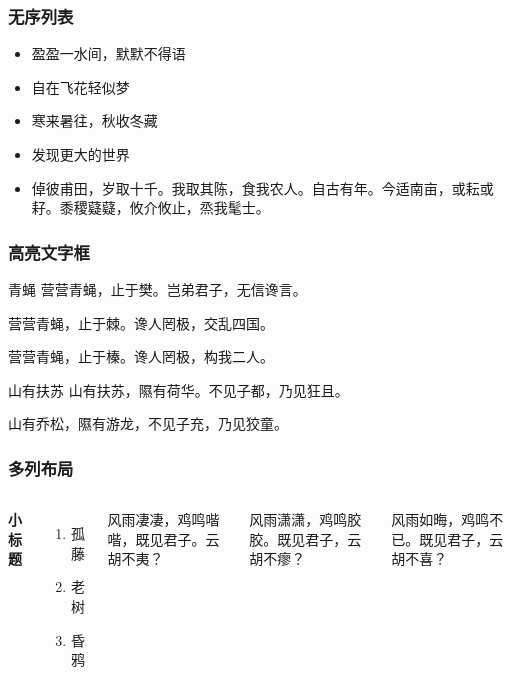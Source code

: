 \documentclass{beamer}
\begin{document}

\begin{frame}
\frametitle{无序列表}
\begin{itemize}
\item 盈盈一水间，默默不得语
\item 自在飞花轻似梦
\item 寒来暑往，秋收冬藏
\item 发现更大的世界
\item 倬彼甫田，岁取十千。我取其陈，食我农人。自古有年。今适南亩，或耘或耔。黍稷薿薿，攸介攸止，烝我髦士。
\end{itemize}
\end{frame}


\begin{frame}
\frametitle{高亮文字框}

\begin{block}{青蝇}
营营青蝇，止于樊。岂弟君子，无信谗言。

营营青蝇，止于棘。谗人罔极，交乱四国。

营营青蝇，止于榛。谗人罔极，构我二人。
\end{block}

\begin{block}{山有扶苏}
山有扶苏，隰有荷华。不见子都，乃见狂且。

山有乔松，隰有游龙，不见子充，乃见狡童。
\end{block}

\end{frame}


\begin{frame}
\frametitle{多列布局}
\begin{columns}[c] %

\textbf{小标题}
\begin{enumerate}
\item 孤藤
\item 老树
\item 昏鸦
\end{enumerate}


风雨凄凄，鸡鸣喈喈，既见君子。云胡不夷？

风雨潇潇，鸡鸣胶胶。既见君子，云胡不瘳？

风雨如晦，鸡鸣不已。既见君子，云胡不喜？

\end{columns}
\end{frame}
\end{document}

